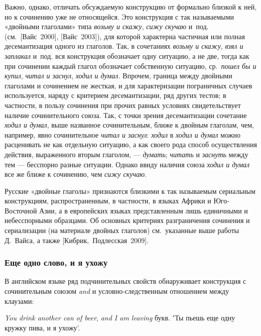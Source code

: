 Важно, однако, отличать обсуждаемую конструкцию от формально близкой к
ней, но к сочинению уже не относящейся. Это конструкция с так
называемыми «двойными глаголами» типа \textit{возьму и скажу}, \textit{сижу
  скучаю} и~под. (см.~{[}Вайс~2000{]}, {[}Вайс~2003{]}), для которой
характерна частичная или полная десемантизация одного из глаголов. Так,
в сочетаниях \textit{возьму и скажу}, \textit{взял и заплакал} и~под. вся
конструкция обозначает одну ситуацию, а не две, тогда как при сочинении
каждый глагол обозначает собственную ситуацию, ср.~\textit{пошел бы и
  купил}, \textit{читал и заснул}, \textit{ходил и думал.} Впрочем, граница
между двойными глаголами и сочинением не жесткая, и для характеризации
пограничных случаев используется, наряду с критерием десемантизации, ряд
других тестов; в частности, в пользу сочинения при прочих равных
условиях свидетельствует наличие сочинительного союза. Так, с точки
зрения десемантизации сочетание \textit{ходил и думал}, выше названное
сочинительным, ближе к двойным глаголам, чем, например, явно
сочинительное \textit{читал и заснул}: \textit{ходил} в \textit{ходил и думал}
можно расценивать не как отдельную ситуацию, а как своего рода способ
осуществления действия, выраженного вторым глаголом, --- \textit{думать};
\textit{читать} и \textit{заснуть} между тем --- бесспорно разные ситуации.
Однако ввиду наличия союза \textit{ходил и думал} все же ближе к
сочинению, чем \textit{сижу скучаю}.

Русские «двойные глаголы» признаются близкими к так называемым
сериальным конструкциям, распространенным, в частности, в языках Африки
и Юго-Восточной Азии, а в европейских языках представленным лишь
единичными и небесспорными образцами. Об основных критериях
разграничения сочинения и сериализации (на материале двойных глаголов)
см.~указанные выше работы Д.~Вайса, а также
{[}Кибрик,~Подлесская~2009{]}.

\subsubsection{Еще одно слово, и я
  ухожу}\label{ux435ux449ux435-ux43eux434ux43dux43e-ux441ux43bux43eux432ux43e-ux438-ux44f-ux443ux445ux43eux436ux443}

В английском языке ряд подчинительных свойств обнаруживает конструкция с
сочинительным союзом \textit{and} и условно-следственным отношением между
клаузами:

\textit{You drink another can of beer}, \textit{and I am leaving} букв. ʽТы
пьешь еще одну кружку пива, и я ухожу'.

